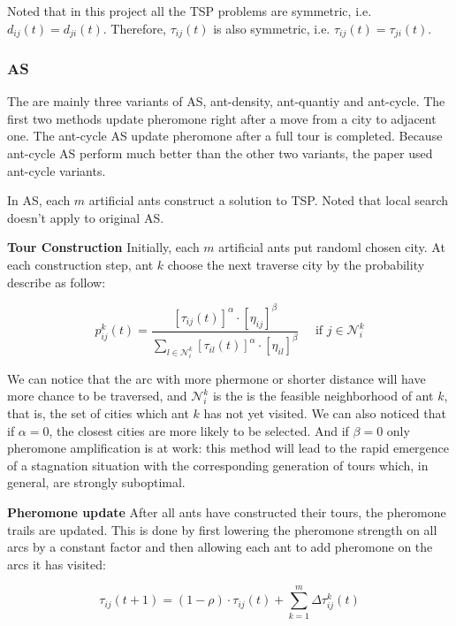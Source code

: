 \documentclass[twocolumn, a4paper]{extarticle}
\begin{document}
	
Noted that in this project all the TSP problems are symmetric, i.e. $d_{ij}(t) = d_{ji}(t)$. Therefore, $\tau_{ij}(t)$ is also symmetric, i.e. $\tau_{ij}(t) = \tau_{ji}(t)$.

\subsubsection{AS}

The are mainly three variants of AS, ant-density, ant-quantiy and ant-cycle. The first two methods update pheromone right after a move from a city to adjacent one. The ant-cycle AS update pheromone after a full tour is completed. Because ant-cycle AS perform much better than the other two variants, the paper used ant-cycle variants.

In AS, each $m$ artificial ants construct a solution to TSP. Noted that local search doesn't apply to original AS.

\textbf{Tour Construction} Initially, each $m$ artificial ants put randoml chosen city. At each construction step, ant $k$ choose the next traverse city by the probability describe as follow:

\begin{equation}
	p_{i j}^k(t)=\frac{\left[\tau_{i j}(t)\right]^\alpha \cdot\left[\eta_{i j}\right]^\beta}{\sum_{l \in \mathcal{N}_i^k}\left[\tau_{i l}(t)\right]^\alpha \cdot\left[\eta_{i l}\right]^\beta} \quad \text { if } j \in \mathcal{N}_i^k
	\label{eq: choice}
\end{equation}

We can notice that the arc with more phermone or shorter distance will have more chance to be traversed, and $\mathcal{N}_i^k$ is the is the feasible neighborhood of ant $k$, that is, the set of cities which ant $k$ has not yet visited. We can also noticed that if $\alpha=0$, the closest cities are more likely to be selected. And if $\beta=0$ only pheromone amplification is at work: this method will lead to the rapid emergence of a stagnation situation with the corresponding generation of tours which, in general, are strongly suboptimal.

\textbf{Pheromone update} After all ants have constructed their tours, the pheromone trails are updated. This is done by first lowering the pheromone strength on all arcs by a constant factor and then allowing each ant to add pheromone on the arcs it has visited:

\begin{equation}
	\tau_{i j}(t+1)=(1-\rho) \cdot \tau_{i j}(t)+\sum_{k=1}^m \Delta \tau_{i j}^k(t)
\end{equation}
\end{document}
